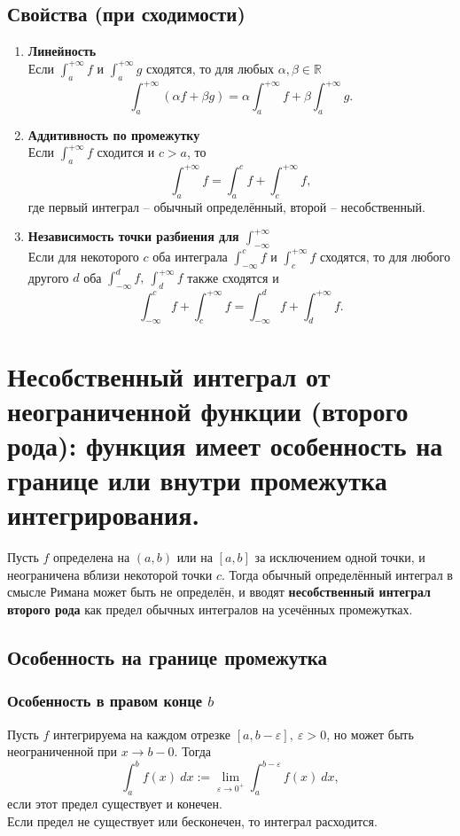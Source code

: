 \documentclass[14pt]{extreport}
\begin{document}
    \section{Свойства (при сходимости)}
    \begin{enumerate}
        \item \textbf{Линейность}\\
        Если $\int_a^{+\infty} f$ и $\int_a^{+\infty} g$ сходятся, то для любых $\alpha, \beta \in \mathbb{R}$
        \[
        \int_a^{+\infty} (\alpha f + \beta g) = \alpha \int_a^{+\infty} f + \beta \int_a^{+\infty} g.
        \]
        
        \item \textbf{Аддитивность по промежутку}\\
        Если $\int_a^{+\infty} f$ сходится и $c>a$, то
        \[
        \int_a^{+\infty} f = \int_a^c f + \int_c^{+\infty} f,
        \]
        где первый интеграл – обычный определённый, второй – несобственный.
        
        \item \textbf{Независимость точки разбиения для $\int_{-\infty}^{+\infty}$}\\
        Если для некоторого $c$ оба интеграла $\int_{-\infty}^c f$ и $\int_c^{+\infty} f$ сходятся, то для любого другого $d$ оба $\int_{-\infty}^d f,\ \int_d^{+\infty} f$ также сходятся и
        \[
        \int_{-\infty}^c f + \int_c^{+\infty} f = \int_{-\infty}^d f + \int_d^{+\infty} f.
        \]
    \end{enumerate}



    \chapter{Несобственный интеграл от неограниченной функции (второго рода): функция имеет особенность на границе или внутри промежутка интегрирования.}

    Пусть $f$ определена на $(a,b)$ или на $[a,b]$ за исключением одной точки, и неограничена вблизи некоторой точки $c$. Тогда обычный определённый интеграл в смысле Римана может быть не определён, и вводят \textbf{несобственный интеграл второго рода} как предел обычных интегралов на усечённых промежутках.

    \section{Особенность на границе промежутка}
    \subsection{Особенность в правом конце $b$}
    Пусть $f$ интегрируема на каждом отрезке $[a,b-\varepsilon],\ \varepsilon>0$, но может быть неограниченной при $x \rightarrow b-0$. Тогда
    \[
    \int_a^b f(x)\ dx := \lim_{\varepsilon \rightarrow 0^+} \int_a^{b-\varepsilon} f(x)\ dx,
    \]
    если этот предел существует и конечен.\\
    Если предел не существует или бесконечен, то интеграл расходится.
\end{document}
